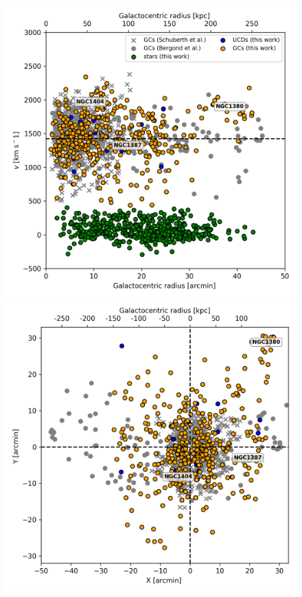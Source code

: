 \documentclass[usenatbib]{mnras}
\begin{document}
\begin{figure}
\centering
\includegraphics[width=\columnwidth]{figures/RV.png} 
\includegraphics[width=\columnwidth]{figures/XY.png} 

\end{figure}
\end{document}
